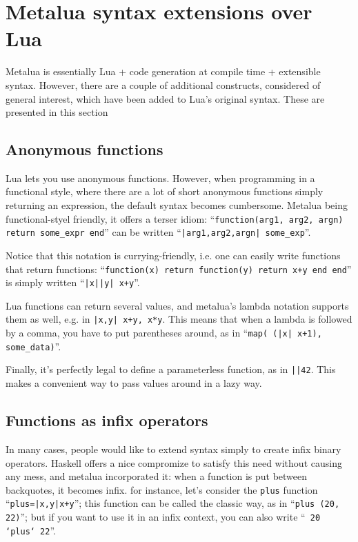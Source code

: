 \section{Metalua syntax extensions over Lua}
Metalua is essentially Lua + code generation at compile time +
extensible syntax. However, there are a couple of additional
constructs, considered of general interest, which have been added to
Lua's original syntax. These are presented in this section

\subsection{Anonymous functions}
Lua lets you use anonymous functions. However, when programming in a
functional style, where there are a lot of short anonymous functions
simply returning an expression, the default syntax becomes
cumbersome. Metalua being functional-styel friendly, it offers a
terser idiom: ``{\tt function(arg1, arg2, argn) return some\_expr
  end}'' can be written ``{\tt|arg1,arg2,argn| some\_exp}''.

Notice that this notation is currying-friendly, i.e. one can easily
write functions that return functions: ``{\tt function(x) return
function(y) return x+y end end}'' is simply written ``{\tt|x||y|
x+y}''.

Lua functions can return several values, and metalua's lambda notation
supports them as well, e.g. in {\tt |x,y| x+y, x*y}. This means that
when a lambda is followed by a comma, you have to put parentheses
around, as in ``{\tt map( (|x| x+1), some\_data)}''.

Finally, it's perfectly legal to define a parameterless function, as
in {\tt ||42}. This makes a convenient way to pass values around in a
lazy way.

\subsection{Functions as infix operators}

In many cases, people would like to extend syntax simply to create
infix binary operators. Haskell offers a nice compromize to satisfy
this need without causing any mess, and metalua incorporated it: when
a function is put between backquotes, it becomes infix. for instance,
let's consider the {\tt plus} function ``{\tt plus=|x,y|x+y}''; this
function can be called the classic way, as in ``{\tt plus (20, 22)}''; but
if you want to use it in an infix context, you can also write ``{\tt
20 `plus` 22}''.

